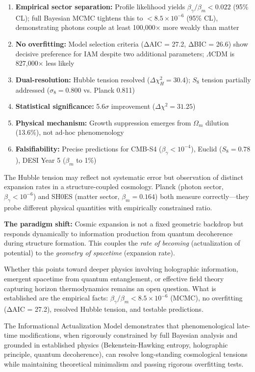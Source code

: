\documentclass[twocolumn,superscriptaddress,prl,amsmath,amssymb]{revtex4-2}
\begin{document}
\begin{enumerate}
\item \textbf{Empirical sector separation:} Profile likelihood yields $\beta_\gamma/\beta_m < 0.022$ (95\% CL); full Bayesian MCMC tightens this to $< 8.5 \times 10^{-6}$ (95\% CL), demonstrating photons couple at least 100,000$\times$ more weakly than matter
\item \textbf{No overfitting:} Model selection criteria (ΔAIC = 27.2, ΔBIC = 26.6) show decisive preference for IAM despite two additional parameters; $\Lambda$CDM is 827,000$\times$ less likely
\item \textbf{Dual-resolution:} Hubble tension resolved ($\Delta\chi^2_H = 30.4$); $S_8$ tension partially addressed ($\sigma_8 = 0.800$ vs. Planck 0.811)
\item \textbf{Statistical significance:} 5.6$\sigma$ improvement ($\Delta\chi^2 = 31.25$)
\item \textbf{Physical mechanism:} Growth suppression emerges from $\Omega_m$ dilution (13.6\%), not ad-hoc phenomenology
\item \textbf{Falsifiability:} Precise predictions for CMB-S4 ($\beta_\gamma < 10^{-4}$), Euclid ($S_8 = 0.78$), DESI Year 5 ($\beta_m$ to 1\%)
\end{enumerate}

The Hubble tension may reflect not systematic error but observation of distinct expansion rates in a structure-coupled cosmology. Planck (photon sector, $\beta_\gamma < 10^{-6}$) and SH0ES (matter sector, $\beta_m = 0.164$) both measure correctly—they probe different physical quantities with empirically constrained ratio.

\textbf{The paradigm shift:} Cosmic expansion is not a fixed geometric backdrop but responds dynamically to information production from quantum decoherence during structure formation. This couples the \textit{rate of becoming} (actualization of potential) to the \textit{geometry of spacetime} (expansion rate).

Whether this points toward deeper physics involving holographic information, emergent spacetime from quantum entanglement, or effective field theory capturing horizon thermodynamics remains an open question. What is established are the empirical facts: $\beta_\gamma/\beta_m < 8.5 \times 10^{-6}$ (MCMC), no overfitting (ΔAIC = 27.2), resolved Hubble tension, and testable predictions.

The Informational Actualization Model demonstrates that phenomenological late-time modifications, when rigorously constrained by full Bayesian analysis and grounded in established physics (Bekenstein-Hawking entropy, holographic principle, quantum decoherence), can resolve long-standing cosmological tensions while maintaining theoretical minimalism and passing rigorous overfitting tests.
\end{document}
